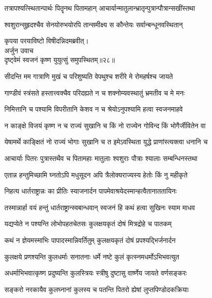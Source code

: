 \twolineshloka
{तत्रापश्यत्स्थितान्पार्थः पितॄनथ पितामहान्}
{आचार्यान्मातुलान्भ्रातृन्पुत्रान्पौत्रान्सखींस्तथा}%

\twolineshloka
{श्वशुरान्सुहृदश्चैव सेनयोरुभयोरपि}
{तान्समीक्ष्य स कौन्तेयः सर्वान्बन्धूनवस्थितान्}%

{कृपया परयाविष्टो विषीदन्निदमब्रवीत्।}\\
{अर्जुन उवाच}\\
{दृष्ट्वेमं स्वजनं कृष्ण युयुत्सुं समुपस्थितम्॥२८॥}%

\twolineshloka
{सीदन्ति मम गात्राणि मुखं च परिशुष्यति}
{वेपथुश्च शरीरे मे रोमहर्षश्च जायते}%

\twolineshloka
{गाण्डीवं स्त्रंसते हस्तात्त्वक्चैव परिदह्यते}
{न च शक्नोम्यवस्थातुं भ्रमतीव च मे मनः}%

\twolineshloka
{निमित्तानि च पश्यामि विपरीतानि केशव}
{न च श्रेयोऽनुपश्यामि हत्वा स्वजनमाहवे}%

\twolineshloka
{न काङ्क्षे विजयं कृष्ण न च राज्यं सुखानि च}
{किं नो राज्येन गोविन्द किं भोगैर्जीवितेन वा}%

\twolineshloka
{येषामर्थे काङ्क्षितं नो राज्यं भोगाः सुखानि च}
{त इमेऽवस्थिता युद्धे प्राणांस्त्यक्त्वा धनानि च}%

\twolineshloka
{आचार्याः पितरः पुत्रास्तथैव च पितामहाः}
{मातुलाः श्वशुराः पौत्राः श्यालाः सम्बन्धिनस्तथा}%

\twolineshloka
{एतान्न हन्तुमिच्छामि घ्नतोऽपि मधुसूदन}
{अपि त्रैलोक्यराज्यस्य हेतोः किं नु महीकृते}%

\twolineshloka
{निहत्य धार्तराष्ट्रान्नः का प्रीतिः स्याजनार्दन}
{पापमेवाश्रयेदस्मान्हत्वैतानाततायिनः}%

\twolineshloka
{तस्मान्नार्हा वयं हन्तुं धार्तराष्ट्रान्स्वबान्धवान्}
{स्वजनं हि कथं हत्वा सुखिनः स्याम माधव}%

\twolineshloka
{यद्यप्येते न पश्यन्ति लोभोपहतचेतसः}
{कुलक्षयकृतं दोषं मित्रद्रोहे च पातकम्}%

\twolineshloka
{कथं न ज्ञेयमस्माभिः पापादस्मान्निवर्तितुम्}
{कुलक्षयकृतं दोषं प्रपश्यद्भिर्जनार्दन}%

\twolineshloka
{कुलक्षये प्रणश्यन्ति कुलधर्माः सनातनाः}
{धर्मे नष्टे कुलं कृत्स्नमधर्मोऽभिभवत्युत}%

\twolineshloka
{अधर्माभिभवात्कृष्ण प्रदुष्यन्ति कुलस्त्रियः}
{स्त्रीषु दुष्टासु वार्ष्णेय जायते वर्णसङ्करः}%

\twolineshloka
{सङ्करो नरकायैव कुलघ्नानां कुलस्य च}
{पतन्ति पितरो ह्येषां लुप्तपिण्डोदकक्रियाः}%


